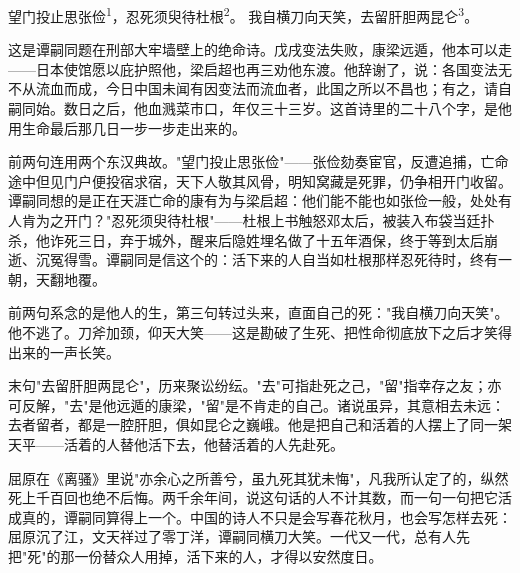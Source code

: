 
\begin{poem}
望门投止思张俭\textsuperscript{1}，忍死须臾待杜根\textsuperscript{2}。
我自横刀向天笑，去留肝胆两昆仑\textsuperscript{3}。
\end{poem}

\begin{annotations}
\end{annotations}

\begin{appreciation}
这是谭嗣同题在刑部大牢墙壁上的绝命诗。戊戌变法失败，康梁远遁，他本可以走——日本使馆愿以庇护照他，梁启超也再三劝他东渡。他辞谢了，说：各国变法无不从流血而成，今日中国未闻有因变法而流血者，此国之所以不昌也；有之，请自嗣同始。数日之后，他血溅菜市口，年仅三十三岁。这首诗里的二十八个字，是他用生命最后那几日一步一步走出来的。

前两句连用两个东汉典故。"望门投止思张俭"——张俭劾奏宦官，反遭追捕，亡命途中但见门户便投宿求宿，天下人敬其风骨，明知窝藏是死罪，仍争相开门收留。谭嗣同想的是正在天涯亡命的康有为与梁启超：他们能不能也如张俭一般，处处有人肯为之开门？"忍死须臾待杜根"——杜根上书触怒邓太后，被装入布袋当廷扑杀，他诈死三日，弃于城外，醒来后隐姓埋名做了十五年酒保，终于等到太后崩逝、沉冤得雪。谭嗣同是信这个的：活下来的人自当如杜根那样忍死待时，终有一朝，天翻地覆。

前两句系念的是他人的生，第三句转过头来，直面自己的死："我自横刀向天笑"。他不逃了。刀斧加颈，仰天大笑——这是勘破了生死、把性命彻底放下之后才笑得出来的一声长笑。

末句"去留肝胆两昆仑"，历来聚讼纷纭。"去"可指赴死之己，"留"指幸存之友；亦可反解，"去"是他远遁的康梁，"留"是不肯走的自己。诸说虽异，其意相去未远：去者留者，都是一腔肝胆，俱如昆仑之巍峨。他是把自己和活着的人摆上了同一架天平——活着的人替他活下去，他替活着的人先赴死。

屈原在《离骚》里说"亦余心之所善兮，虽九死其犹未悔"，凡我所认定了的，纵然死上千百回也绝不后悔。两千余年间，说这句话的人不计其数，而一句一句把它活成真的，谭嗣同算得上一个。中国的诗人不只是会写春花秋月，也会写怎样去死：屈原沉了江，文天祥过了零丁洋，谭嗣同横刀大笑。一代又一代，总有人先把"死"的那一份替众人用掉，活下来的人，才得以安然度日。
\end{appreciation}
